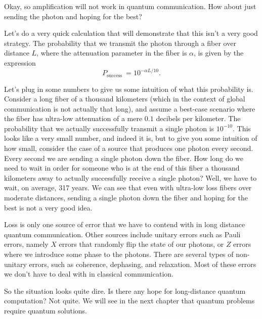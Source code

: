 Okay, so amplification will not work in quantum communication. How about just sending the photon and hoping for the best?

Let's do a very quick calculation that will demonstrate that this isn't a very good strategy. The probability that we transmit the photon through a fiber over distance $L$, where the attenuation parameter in the fiber is $\alpha$, is given by the expression
\begin{equation}
P_{\text {success }}=10^{-\alpha L / 10}.
\end{equation}

Let's plug in some numbers to give us some intuition of what this probability is. Consider a long fiber of a thousand kilometers (which in the context of global communication is not actually that long), and assume a best-case scenario where the fiber has ultra-low attenuation of a mere $0.1$ decibels per kilometer. The probability that we actually successfully transmit a single photon is $10^{-10}$. This looks like a very small number, and indeed it is, but to give you some intuition of  how small, consider the case of a source that produces one photon every second. Every second we are sending a single photon down the fiber. How long do we need to wait in order for someone who is at the end of this fiber a thousand kilometers away to actually successfully receive a single photon? Well, we have to wait, on average, 317 years. We can see that even with ultra-low loss fibers over moderate distances, sending a single photon down the fiber and hoping for the best is not a very good idea.

Loss is only one source of error that we have to contend with in long distance quantum communication. Other sources include unitary errors such as Pauli errors, namely $X$ errors that randomly flip the state of our photons, or $Z$ errors where we introduce some phase to the photons. There are several types of non-unitary errors, such as coherence, dephasing, and relaxation.  Most of these errors we don't have to deal with in classical communication.

So the situation looks quite dire. Is there any hope for long-distance quantum computation? Not quite. We will see in the next chapter that quantum problems require quantum solutions.



